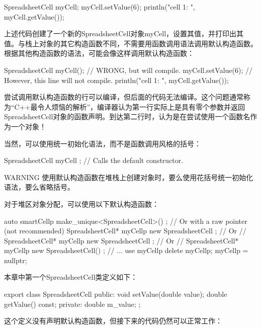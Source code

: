 \begin{cpp}
SpreadsheetCell myCell;
myCell.setValue(6);
println("cell 1: {}", myCell.getValue());
\end{cpp}

上述代码创建了一个新的SpreadsheetCell对象myCell，设置其值，并打印出其值。与栈上对象的其它构造函数不同，不需要用函数调用语法调用默认构造函数。根据其他构造函数的语法，可能会像这样调用默认构造函数：

\begin{cpp}
SpreadsheetCell myCell(); // WRONG, but will compile.
myCell.setValue(6); // However, this line will not compile.
println("cell 1: {}", myCell.getValue());
\end{cpp}

尝试调用默认构造函数的行可以编译，但后面的代码无法编译。这个问题通常称为“C++最令人烦恼的解析”，编译器认为第一行实际上是具有零个参数并返回SpreadsheetCell对象的函数声明。到达第二行时，认为是在尝试使用一个函数名作为一个对象！

当然，可以使用统一初始化语法，而不是函数调用风格的括号：

\begin{cpp}
SpreadsheetCell myCell { }; // Calls the default constructor.
\end{cpp}

\begin{myWarning}{WARNING}
使用默认构造函数在堆栈上创建对象时，要么使用花括号统一初始化语法，要么省略括号。
\end{myWarning}

对于堆区对象分配，可以使用以下默认构造函数：

\begin{cpp}
auto smartCellp { make_unique<SpreadsheetCell>() };
// Or with a raw pointer (not recommended)
SpreadsheetCell* myCellp { new SpreadsheetCell { } };
// Or
// SpreadsheetCell* myCellp { new SpreadsheetCell };
// Or
// SpreadsheetCell* myCellp { new SpreadsheetCell() };
// ... use myCellp
delete myCellp; myCellp = nullptr;
\end{cpp}


本章中第一个SpreadsheetCell类定义如下：

\begin{cpp}
export class SpreadsheetCell
{
    public:
        void setValue(double value);
        double getValue() const;
    private:
        double m_value;
};
\end{cpp}

这个定义没有声明默认构造函数，但接下来的代码仍然可以正常工作：

